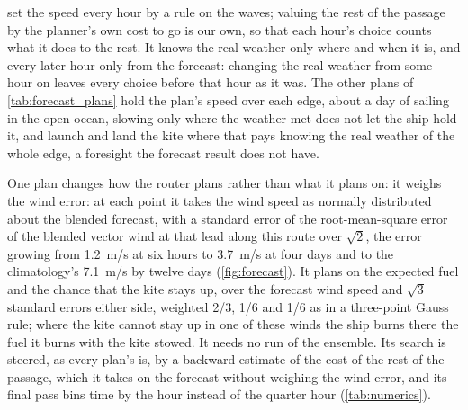 \citet{marjanovic2026} set the speed every hour by a rule on the waves; valuing the rest of the passage by the planner's own cost to go is our own, so that each hour's choice counts what it does to the rest.  It knows the real weather only where and when it is, and every later hour only from the forecast: changing the real weather from some hour on leaves every choice before that hour as it was. The other plans of \cref{tab:forecast_plans} hold the plan's speed over each edge, about a day of sailing in the open ocean, slowing only where the weather met does not let the ship hold it, and launch and land the kite where that pays knowing the real weather of the whole edge, a foresight the forecast result does not have. 

One plan changes how the router plans rather than what it plans on: it weighs the wind error: at each point it takes the wind speed as normally distributed about the blended forecast, with a standard error of the root-mean-square error of the blended vector wind at that lead along this route over $\sqrt{2}$, the error growing from \SI{1.2}{m/s} at six hours to \SI{3.7}{m/s} at four days and to the climatology's \SI{7.1}{m/s} by twelve days (\cref{fig:forecast}). It plans on the expected fuel and the chance that the kite stays up, over the forecast wind speed and $\sqrt{3}$ standard errors either side, weighted 2/3, 1/6 and 1/6 as in a three-point Gauss rule; where the kite cannot stay up in one of these winds the ship burns there the fuel it burns with the kite stowed. It needs no run of the ensemble. Its search is steered, as every plan's is, by a backward estimate of the cost of the rest of the passage, which it takes on the forecast without weighing the wind error, and its final pass bins time by the hour instead of the quarter hour (\cref{tab:numerics}).

